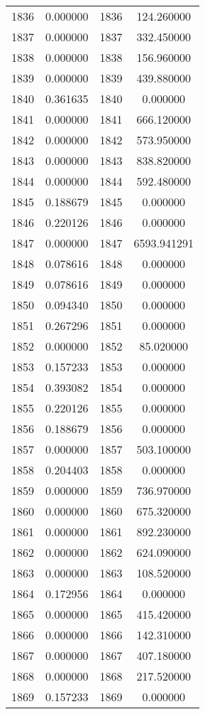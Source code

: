 \documentclass[12pt]{article}
\begin{document}
\begin{longtable}{@{}cccc@{}}
1836 & 0.000000 & 1836 & 124.260000 \\
1837 & 0.000000 & 1837 & 332.450000 \\
1838 & 0.000000 & 1838 & 156.960000 \\
1839 & 0.000000 & 1839 & 439.880000 \\
1840 & 0.361635 & 1840 & 0.000000 \\
1841 & 0.000000 & 1841 & 666.120000 \\
1842 & 0.000000 & 1842 & 573.950000 \\
1843 & 0.000000 & 1843 & 838.820000 \\
1844 & 0.000000 & 1844 & 592.480000 \\
1845 & 0.188679 & 1845 & 0.000000 \\
1846 & 0.220126 & 1846 & 0.000000 \\
1847 & 0.000000 & 1847 & 6593.941291 \\
1848 & 0.078616 & 1848 & 0.000000 \\
1849 & 0.078616 & 1849 & 0.000000 \\
1850 & 0.094340 & 1850 & 0.000000 \\
1851 & 0.267296 & 1851 & 0.000000 \\
1852 & 0.000000 & 1852 & 85.020000 \\
1853 & 0.157233 & 1853 & 0.000000 \\
1854 & 0.393082 & 1854 & 0.000000 \\
1855 & 0.220126 & 1855 & 0.000000 \\
1856 & 0.188679 & 1856 & 0.000000 \\
1857 & 0.000000 & 1857 & 503.100000 \\
1858 & 0.204403 & 1858 & 0.000000 \\
1859 & 0.000000 & 1859 & 736.970000 \\
1860 & 0.000000 & 1860 & 675.320000 \\
1861 & 0.000000 & 1861 & 892.230000 \\
1862 & 0.000000 & 1862 & 624.090000 \\
1863 & 0.000000 & 1863 & 108.520000 \\
1864 & 0.172956 & 1864 & 0.000000 \\
1865 & 0.000000 & 1865 & 415.420000 \\
1866 & 0.000000 & 1866 & 142.310000 \\
1867 & 0.000000 & 1867 & 407.180000 \\
1868 & 0.000000 & 1868 & 217.520000 \\
1869 & 0.157233 & 1869 & 0.000000 \\

\end{longtable}
\end{document}
